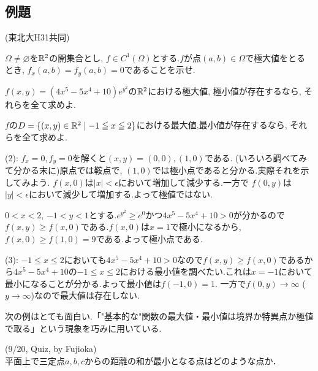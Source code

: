 \subsection{例題}
\begin{egprob} (東北大H31共同)\\
\ben
\item $\Omega\neq \varnothing$を$\mathbb{R}^2$の開集合とし, $f\in C^{1}(\Omega)$とする.$f$が点$(a,b)\in \Omega$で極大値をとるとき, $f_x(a,b) = f_y(a,b) = 0$であることを示せ.
\item $f(x,y) = (4x^5 - 5x^4 + 10)e^{y^2}$の$\mathbb{R}^2$における極大値, 極小値が存在するなら, それらを全て求めよ.
\item $f$の$D=\{ (x,y)\in \mathbb{R}^2\mid -1\leqq x\leqq 2 \}$における最大値,最小値が存在するなら, それらを全て求めよ.
\een
\end{egprob}
\begin{egans}
(2): $f_x = 0, f_y=0$を解くと$(x,y) = (0,0), (1,0)$である. (いろいろ調べてみて分かる末に)原点では鞍点で, $(1,0)$では極小点であると分かる.実際それを示してみよう.
$f(x,0)$は$|x| < \epsilon$において増加して減少する.一方で
$f(0,y)$は$|y|<\epsilon$において減少して増加する.よって極値ではない.

$0<x<2$, $-1<y<1$とする.$e^{y^2} \geq e^{0}$かつ$4x^5 - 5x^4 + 10 > 0$が分かるので$f(x,y) \geq f(x,0)$である.$f(x,0)$は$x=1$で極小になるから, $f(x,0) \geq f(1,0) = 9$である.よって極小点である.

(3): $-1\leq x \leq 2$においても$4x^5 - 5x^4 + 10 > 0$なので$f(x,y) \geq f(x,0)$であるから$4x^5 - 5x^4 + 10$の$-1\leq x\leq 2$における最小値を調べたい.これは$x=-1$において最小になることが分かる.よって最小値は$f(-1,0) = 1$. 一方で$f(0,y) \to \infty$ ($y\to \infty$)なので最大値は存在しない.
\end{egans}

次の例はとても面白い.「"基本的な"関数の最大値・最小値は境界か特異点か極値で取る」という現象を巧みに用いている.

\begin{egprob} (9/20, Quiz, by Fujioka) \label{egprob:9.20fujioka}\\
平面上で三定点$a,b,c$からの距離の和が最小となる点はどのような点か．
\end{egprob}

